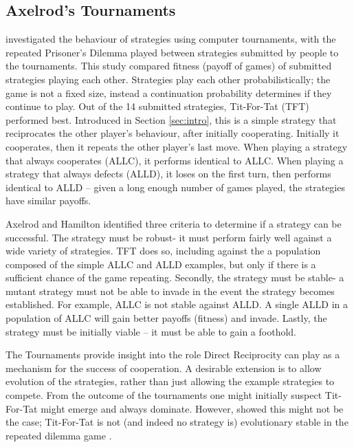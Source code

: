 \documentclass[a4paper,11pt,bcshonoursthesis,singlespace,oneside,thesisdraft,pdflatex]{cssethesis}
\begin{document}
\subsection{Axelrod's Tournaments}
\citet{axelrod:Science:1981} investigated the behaviour of strategies using computer tournaments, with the repeated Prisoner's Dilemma played between strategies submitted by people to the tournaments. 
This study compared fitness (payoff of games) of submitted strategies playing each other. 
Strategies play each other probabilistically; the game is not a fixed size, instead a continuation probability determines if they continue to play. Out of the 14 submitted strategies, Tit-For-Tat (TFT) performed best. 
Introduced in Section \ref{sec:intro}, this is a simple strategy that reciprocates the other player's behaviour, after initially cooperating. 
Initially it cooperates, then it repeats the other player's last move. 
When playing a strategy that always cooperates (ALLC), it performs identical to ALLC. 
When playing a strategy that always defects (ALLD), it loses on the first turn, then performs identical to ALLD -- given a long enough number of games played, the strategies have similar payoffs. 

Axelrod and Hamilton identified three criteria to determine if a strategy can be successful. The strategy must be robust- it must perform fairly well against a wide variety of strategies. TFT does so, including against the a population composed of the simple ALLC and ALLD examples, but only if there is a sufficient chance of the game repeating. Secondly, the strategy must be stable- a mutant strategy must not be able to invade in the event the strategy becomes established. For example, ALLC is not stable against ALLD. 
A single ALLD in a population of ALLC will gain better payoffs (fitness) and invade. 
Lastly, the strategy must be initially viable -- it must be able to gain a foothold. 

The Tournaments provide insight into the role Direct Reciprocity can play as a mechanism for the success of cooperation. 
A desirable extension is to allow evolution of the strategies, rather than just allowing the example strategies to compete. 
From the outcome of the tournaments one might initially suspect Tit-For-Tat might emerge and always dominate. However, \citet{boyd1987no} showed this might not be the case; Tit-For-Tat is not (and indeed no strategy is) evolutionary stable in the repeated dilemma game \citep{boyd1987no}. 
\end{document}
